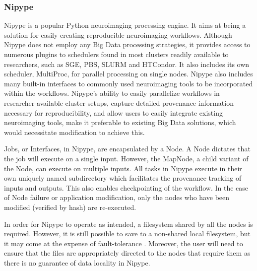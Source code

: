 \documentclass{IEEEtran}
\newcommand{\todo}[1]{\marginpar{\parbox{18mm}{\flushleft\tiny\color{red}\textbf{TODO}:
      #1}}}
\begin{document}


\subsubsection{Nipype}

Nipype is a popular Python neuroimaging processing engine. It aims at being a 
solution for easily creating reproducible neuroimaging workflows. Although Nipype
does not employ any Big Data processing strategies, it provides access to numerous
plugins to schedulers found in most clusters readily available to researchers, 
such as SGE, PBS, SLURM and HTCondor\todo{expand acronyms}. It also includes its own scheduler, MultiProc,
for parallel processing on single nodes. Nipype also includes many built-in 
interfaces to commonly used neuroimaging tools to be incorporated within the 
workflows. Nipype's ability to easily parallelize workflows in researcher-available 
cluster setups, capture detailed provenance information necessary for reproducibility,
and allow users to easily integrate existing neuroimaging tools, make it preferable
to existing Big Data solutions, which would necessitate modification to achieve this.

Jobs, or Interfaces, in Nipype, are encapsulated by a Node. A Node dictates that
the job will execute on a single input. However, the MapNode, 
a child variant of the Node, can execute on multiple inputs. All tasks in
Nipype execute in their own uniquely named subdirectory which facilitates the provenance 
tracking of inputs and outputs. This also enables checkpointing of the workflow.
In the case of Node failure or application modification, only the nodes who have
been modified (verified by hash) are re-executed.

In order for Nipype to operate as intended, a filesystem shared by all the nodes 
is required. However, it is still possible to save to a non-shared local filesystem, 
but it may come at the expense of fault-tolerance \todo{explain why}. Moreover, the user will need to
ensure that the files are appropriately directed to the nodes that require them as
there is no guarantee of data locality in Nipype.
\end{document}
